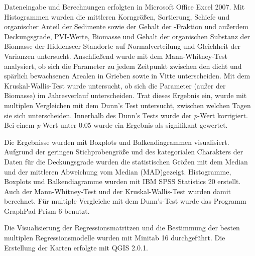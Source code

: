 Dateneingabe und Berechnungen erfolgten in Microsoft Office Excel 2007. Mit Histogrammen wurden die mittleren Korngrößen, Sortierung, Schiefe und organischer Anteil der Sedimente sowie der Gehalt der -Fraktion und außerdem Deckungsgrade, PVI-Werte, Biomasse und Gehalt der organischen Substanz der Biomasse der Hiddenseer Standorte auf Normalverteilung und Gleichheit der Varianzen untersucht. Anschließend wurde mit dem Mann-Whitney-Test analysiert, ob sich die Parameter zu jedem Zeitpunkt zwischen den dicht und spärlich bewachsenen Arealen in Grieben sowie in Vitte unterscheiden. Mit dem Kruskal-Wallis-Test wurde untersucht, ob sich die Parameter (außer der Biomasse) im Jahresverlauf unterscheiden. Trat dieses Ergebnis ein, wurde mit multiplen Vergleichen mit dem Dunn's Test untersucht, zwischen welchen Tagen sie sich unterscheiden. Innerhalb des Dunn's Tests wurde der \textit{p}-Wert korrigiert. Bei einem \textit{p}-Wert unter 0.05 wurde ein Ergebnis als signifikant gewertet.

Die Ergebnisse wurden mit Boxplots und Balkendiagrammen visualisiert. Aufgrund der geringen Stichprobengröße und des kategorialen Charakters der Daten für die Deckungsgrade wurden die statistischen Größen mit dem Median und der mittleren Abweichung vom Median (MAD)gezeigt. Histogramme, Boxplots und Balkendiagramme wurden mit IBM SPSS Statistics 20 erstellt. Auch der Mann-Whitney-Test und der Kruskal-Wallis-Test wurden damit berechnet. Für multiple Vergleiche mit dem Dunn's-Test wurde das Programm GraphPad Prism 6 benutzt. 

Die Visualisierung der Regressionsmatritzen und die Bestimmung der besten multiplen Regressionsmodelle wurden mit Minitab 16 durchgeführt. Die Erstellung der Karten erfolgte mit QGIS 2.0.1. 

